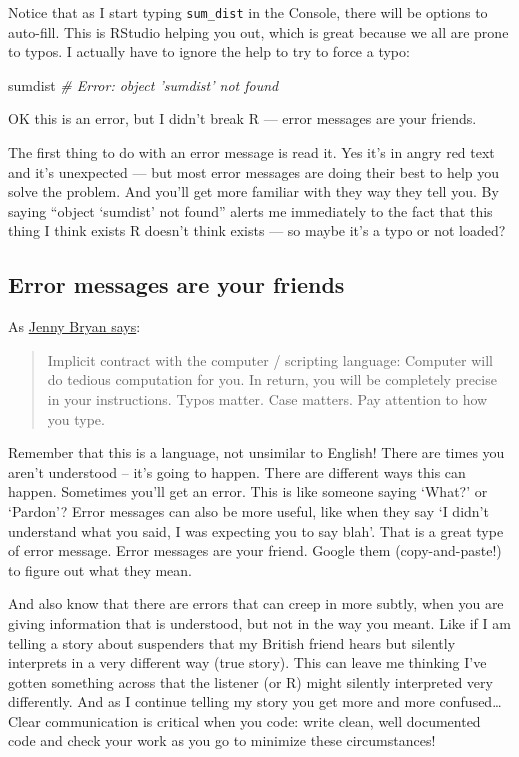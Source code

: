 \documentclass[]{book}
\newenvironment{Shaded}{\begin{snugshade}}{\end{snugshade}}
\newcommand{\CommentTok}[1]{\textcolor[rgb]{0.56,0.35,0.01}{\textit{#1}}}
\newcommand{\NormalTok}[1]{#1}
\begin{document}
Notice that as I start typing \texttt{sum\_dist} in the Console, there will be options to auto-fill. This is RStudio helping you out, which is great because we all are prone to typos. I actually have to ignore the help to try to force a typo:

\begin{Shaded}
\begin{Highlighting}[]
\NormalTok{sumdist}
\CommentTok{# Error: object 'sumdist' not found}
\end{Highlighting}
\end{Shaded}

OK this is an error, but I didn't break R --- error messages are your friends.

The first thing to do with an error message is read it. Yes it's in angry red text and it's unexpected --- but most error messages are doing their best to help you solve the problem. And you'll get more familiar with they way they tell you. By saying ``object `sumdist' not found'' alerts me immediately to the fact that this thing I think exists R doesn't think exists --- so maybe it's a typo or not loaded?

\hypertarget{error-messages-are-your-friends}{%
\subsection{Error messages are your friends}\label{error-messages-are-your-friends}}

As \href{https://stat545.com/r-basics.html}{Jenny Bryan says}:

\begin{quote}
Implicit contract with the computer / scripting language: Computer will do tedious computation for you. In return, you will be completely precise in your instructions. Typos matter. Case matters. Pay attention to how you type.
\end{quote}

Remember that this is a language, not unsimilar to English! There are times you aren't understood -- it's going to happen. There are different ways this can happen. Sometimes you'll get an error. This is like someone saying `What?' or `Pardon'? Error messages can also be more useful, like when they say `I didn't understand what you said, I was expecting you to say blah'. That is a great type of error message. Error messages are your friend. Google them (copy-and-paste!) to figure out what they mean.

And also know that there are errors that can creep in more subtly, when you are giving information that is understood, but not in the way you meant. Like if I am telling a story about suspenders that my British friend hears but silently interprets in a very different way (true story). This can leave me thinking I've gotten something across that the listener (or R) might silently interpreted very differently. And as I continue telling my story you get more and more confused\ldots{} Clear communication is critical when you code: write clean, well documented code and check your work as you go to minimize these circumstances!
\end{document}
